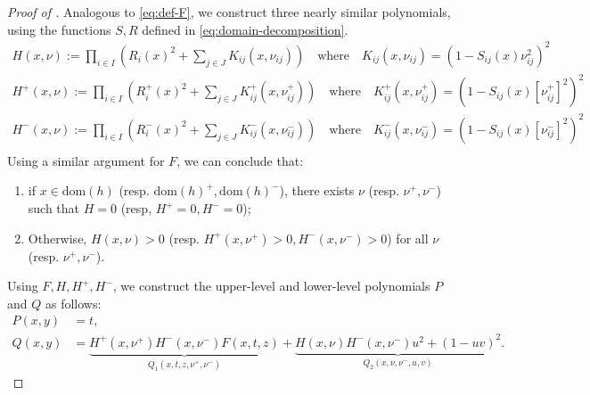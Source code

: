 \documentclass{article}
\newcommand{\firstvar}{x}
\newcommand{\secondvar}{y}
\newcommand{\dom}{\mathrm{dom}}
\theoremstyle{plain}
\theoremstyle{definition}
\begin{document}
\begin{proof}[Proof of ]
    Analogous to \eqref{eq:def-F}, we construct three nearly similar polynomials, using the functions $S, R$ defined in \eqref{eq:domain-decomposition}.
    \begin{equation}
        \label{eq:def-H}
        \begin{aligned}
            H(\firstvar, \nu) :=  \prod_{i \in I} \left(R_i(\firstvar)^2 + \sum_{j \in J} K_{ij}(\firstvar,\nu_{ij})\right) \quad \text{where} \quad K_{ij}(\firstvar, \nu_{ij}) = (1 - S_{ij}(\firstvar)\nu_{ij}^2)^2\\  
            H^+(\firstvar, \nu) :=  \prod_{i \in I} \left(R^+_i(\firstvar)^2 + \sum_{j \in J} K^+_{ij}(\firstvar,\nu^+_{ij})\right) \quad \text{where} \quad K^+_{ij}(\firstvar, \nu^+_{ij}) = (1 - S_{ij}(\firstvar)[\nu^+_{ij}]^2)^2\\  
            H^-(\firstvar, \nu) :=  \prod_{i \in I} \left(R^-_i(\firstvar)^2 + \sum_{j \in J} K^-_{ij}(\firstvar,\nu^-_{ij})\right) \quad \text{where} \quad K^-_{ij}(\firstvar, \nu^-_{ij}) = (1 - S_{ij}(\firstvar)[\nu^-_{ij}]^2)^2\\  
        \end{aligned}
    \end{equation}
    Using a similar argument for $F$, we can conclude that: 
    \begin{enumerate}
        \item if $\firstvar \in \dom(h)$ (resp. $\dom(h)^+, \dom(h)^-$), there exists $\nu$ (resp. $\nu^+, \nu^-$) such that $H = 0$ (resp, $H^+ = 0, H^- = 0$);
        \item Otherwise, $H(\firstvar, \nu) > 0$ (resp. $H^+(\firstvar, \nu^+) > 0, H^-(\firstvar, \nu^-) > 0$) for all $\nu$ (resp. $\nu^+, \nu^-$).
    \end{enumerate}
     
    
    Using $F, H, H^+, H^-$, we construct the upper-level and lower-level polynomials $P$ and $Q$ as follows:
    \begin{equation*}
        \begin{aligned}
            P(\firstvar,\secondvar) &= t, \\
            Q(\firstvar,\secondvar) &= \underbrace{H^+(\firstvar, \nu^+)H^-(\firstvar, \nu^-)F(\firstvar, t, z)}_{Q_1(\firstvar, t, z, \nu^+, \nu^-)} + \underbrace{H(\firstvar, \nu)H^-(\firstvar, \nu^-)u^2 + (1 - uv)^2}_{Q_2(\firstvar, \nu, \nu^-, u, v)}.
        \end{aligned}
    \end{equation*}


\end{proof}
\end{document}
